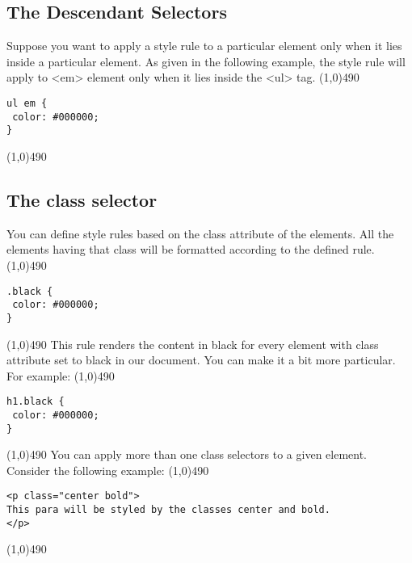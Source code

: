 \documentclass{report}
\begin{document}
    \pagebreak \bigbreak \noindent 
    \subsection{The Descendant Selectors}
    \bigbreak \noindent 
    Suppose you want to apply a style rule to a particular element only when it lies inside a particular element. As given in the following example, the style rule will apply to <em> element only when it lies inside the <ul> tag.
    \bigbreak \noindent 
    \line(1,0){490}
    \begin{verbatim}
ul em {
 color: #000000;
} 
    \end{verbatim}
    \line(1,0){490}

    \bigbreak \noindent 
    \subsection{The class selector}
    \bigbreak \noindent 
    You can define style rules based on the class attribute of the elements. All the
elements having that class will be formatted according to the defined rule.
\bigbreak \noindent 
    \line(1,0){490}
    \begin{verbatim}
.black {
 color: #000000;
}
    \end{verbatim}

    \line(1,0){490}
    \bigbreak \noindent 
    This rule renders the content in black for every element with class attribute set
to black in our document. You can make it a bit more particular. For example:
\bigbreak \noindent 
\line(1,0){490}
\begin{verbatim}
h1.black {
 color: #000000;
}
\end{verbatim}
\line(1,0){490}
\bigbreak \noindent 
You can apply more than one class selectors to a given element. Consider the
following example:
\bigbreak \noindent 
\line(1,0){490}
\begin{verbatim}
<p class="center bold">
This para will be styled by the classes center and bold.
</p>
\end{verbatim}
\line(1,0){490}

    \pagebreak \bigbreak \noindent 
\end{document}
